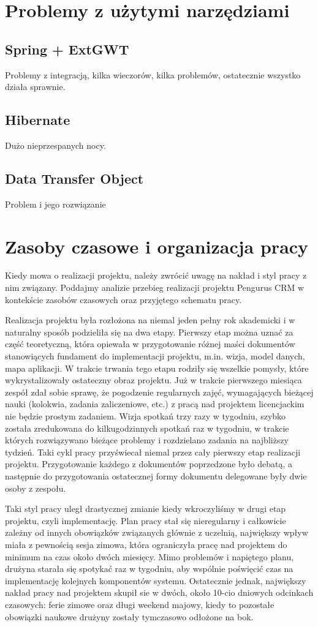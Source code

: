 \documentclass[licencjacka]{pracamgr}
\begin{document}
\section{Problemy z użytymi narzędziami}
\subsection{Spring + ExtGWT}
Problemy z integracją, kilka wieczorów, kilka problemów, ostatecznie wszystko działa sprawnie.
\subsection{Hibernate}
Dużo nieprzespanych nocy.
\subsection{Data Transfer Object}
Problem i jego rozwiązanie
\section{Zasoby czasowe i organizacja pracy}
Kiedy mowa o realizacji projektu, należy zwrócić uwagę na nakład i styl pracy z nim związany. 
Poddajmy analizie przebieg realizacji projektu Pengurus CRM w kontekście zasobów czasowych oraz przyjętego schematu pracy.


Realizacja projektu była rozłożona na niemal jeden pełny rok akademicki i w naturalny sposób podzieliła się na dwa etapy. 
Pierwszy etap można uznać za część teoretyczną, która opiewała w przygotowanie różnej maści dokumentów stanowiących fundament do implementacji projektu, 
m.in. wizja, model danych, mapa aplikacji.
W trakcie trwania tego etapu rodziły się wszelkie pomysły, które wykrystalizowały ostateczny obraz projektu. 
Już w trakcie pierwszego miesiąca zespół zdał sobie sprawę, że pogodzenie regularnych zajęć, wymagających bieżącej nauki
(kolokwia, zadania zaliczeniowe, etc.) z pracą nad projektem licencjackim nie będzie prostym zadaniem. 
Wizja spotkań trzy razy w tygodniu, szybko została zredukowana do kilkugodzinnych spotkań raz w tygodniu, 
w trakcie których rozwiązywano bieżące problemy i rozdzielano zadania na najbliższy tydzień. 
Taki cykl pracy przyświecał niemal przez cały pierwszy etap realizacji projektu.
Przygotowanie każdego z dokumentów poprzedzone było debatą, 
a następnie do przygotowania ostatecznej formy dokumentu delegowane były dwie osoby z zespołu.


Taki styl pracy uległ drastycznej zmianie kiedy wkroczyliśmy w drugi etap projektu, czyli implementację.
Plan pracy stał się nieregularny i całkowicie zależny od innych obowiązków związanych głównie z uczelnią, 
największy wpływ miała z pewnością sesja zimowa, która ograniczyła pracę nad projektem do minimum na czas około dwóch miesięcy.
Mimo problemów i napiętego planu, drużyna starała się spotykać raz w tygodniu, aby wspólnie poświęcić czas na implementację 
kolejnych komponentów systemu. Ostatecznie jednak, największy nakład pracy nad projektem skupił sie w dwóch, około 10-cio dniowych odcinkach czasowych:
ferie zimowe oraz długi weekend majowy, kiedy to pozostałe obowiązki naukowe drużyny zostały tymczasowo odłożone na bok.
\end{document}
